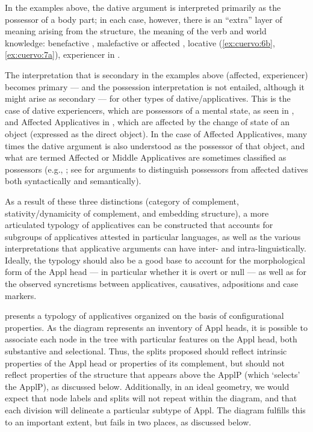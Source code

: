 \documentclass[output=paper,colorlinks,citecolor=brown,modfonts,nonflat]{langsci/langscibook}
\begin{document}
In the examples above, the dative argument is interpreted primarily as the possessor of a body part; in each case, however, there is an “extra” layer of meaning arising from the structure, the meaning of the verb and world knowledge: benefactive , malefactive or affected , locative (\ref{ex:cuervo:6b}, \ref{ex:cuervo:7a}), experiencer in .

The interpretation that is secondary in the examples above (affected, experiencer) becomes primary — and the possession interpretation is not entailed, although it might arise as secondary — for other types of dative/applicatives. This is the case of dative experiencers, which are possessors of a mental state, as seen in , and Affected Applicatives in , which are affected by the change of state of an object (expressed as the direct object). In the case of Affected Applicatives, many times the dative argument is also understood as the possessor of that object, and what are termed Affected or Middle Applicatives are sometimes classified as possessors (e.g., \citealt{FernándezAlcalde2014}; see \citealt{Cuervo2003} for arguments to distinguish possessors from affected datives both syntactically and semantically).

As a result of these three distinctions (category of complement, stativity/dynamicity of complement, and embedding structure), a more articulated typology of applicatives can be constructed that accounts for subgroups of applicatives attested in particular languages, as well as the various interpretations that applicative arguments can have inter- and intra-linguistically. Ideally, the typology should also be a good base to account for the morphological form of the Appl head — in particular whether it is overt or null — as well as for the observed syncretisms between applicatives, causatives, adpositions and case markers.


 presents a typology of applicatives organized on the basis of configurational properties. As the diagram represents an inventory of Appl heads, it is possible to associate each node in the tree with particular features on the Appl head, both substantive and selectional. Thus, the splits proposed should reflect intrinsic properties of the Appl head or properties of its complement, but should not reflect properties of the structure that appears above the ApplP (which ‘selects’ the ApplP), as discussed below. Additionally, in an ideal geometry, we would expect that node labels and splits will not repeat within the diagram, and that each division will delineate a particular subtype of Appl. The diagram fulfills this to an important extent, but fails in two places, as discussed below.
\end{document}
